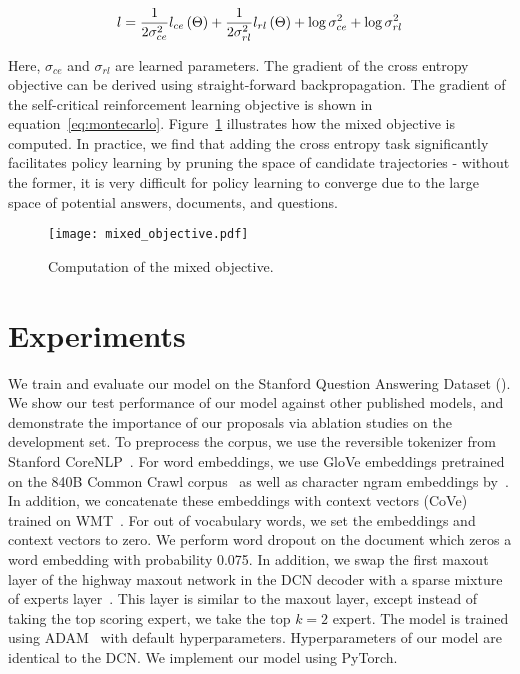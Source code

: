 \documentclass{article} %
\begin{document}
\begin{eqnarray}
l = \frac{1}{2 \sigma_{ce}^2} l_{ce}\left(\Theta\right) + \frac{1}{2 \sigma_{rl}^2} l_{rl}\left(\Theta\right) + \log \sigma_{ce}^2 + \log \sigma_{rl}^2
\end{eqnarray}

Here, $\sigma_{ce}$ and $\sigma_{rl}$ are learned parameters.
The gradient of the cross entropy objective can be derived using straight-forward backpropagation.
The gradient of the self-critical reinforcement learning objective is shown in equation~\ref{eq:montecarlo}.
Figure~\ref{fig:mixed_objective} illustrates how the mixed objective is computed.
In practice, we find that adding the cross entropy task significantly facilitates policy learning by pruning the space of candidate trajectories - without the former, it is very difficult for policy learning to converge due to the large space of potential answers, documents, and questions.

\begin{figure}[t!] 
  \begin{center}
	\texttt{[image: mixed\_objective.pdf]}
  \end{center}
  \vspace{-2mm}
  \caption{
  Computation of the mixed objective.
}\label{fig:mixed_objective}
  \vspace{-2mm}
\end{figure}


\section{Experiments}
\vspace{-2mm}

We train and evaluate our model on the Stanford Question Answering Dataset (\squad).
We show our test performance of our model against other published models, and demonstrate the importance of our proposals via ablation studies on the development set.
To preprocess the corpus, we use the reversible tokenizer from Stanford CoreNLP~\citep{Manning2014TheSC}.
For word embeddings, we use GloVe embeddings pretrained on the 840B Common Crawl corpus~\citep{Pennington2014GloveGV} as well as character ngram embeddings by~\citet{Hashimoto2017AJM}.
In addition, we concatenate these embeddings with context vectors (CoVe) trained on WMT~\citep{McCann2017Learned}.
For out of vocabulary words, we set the embeddings and context vectors to zero.
We perform word dropout on the document which zeros a word embedding with probability 0.075.
In addition, we swap the first maxout layer of the highway maxout network in the DCN decoder with a sparse mixture of experts layer~\citep{shazeer2017outrageously}.
This layer is similar to the maxout layer, except instead of taking the top scoring expert, we take the top $k = 2$ expert.
The model is trained using ADAM~\citep{Kingma2014AdamAM} with default hyperparameters.
Hyperparameters of our model are identical to the DCN.
We implement our model using PyTorch.
\end{document}
